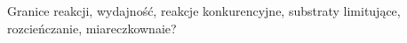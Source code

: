 Granice reakcji, wydajność, reakcje konkurencyjne, substraty limitujące, rozcieńczanie, miareczkownaie?